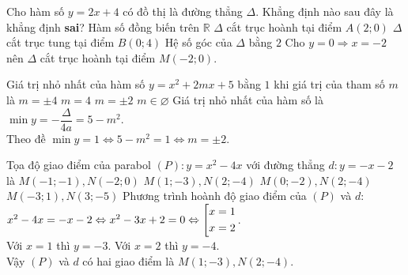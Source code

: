 \begin{ex}%
Cho hàm số $y=2x+4$ có đồ thị là đường thẳng $\Delta$. Khẳng định nào sau đây là khẳng định \textbf{sai}?
\choice
{Hàm số đồng biến trên $\mathbb{R}$}
{\True $\Delta$ cắt trục hoành tại điểm $A\left(2;0\right)$}
{$\Delta$ cắt trục tung tại điểm $B\left(0;4\right)$}
{Hệ số góc của $\Delta$ bằng $2$}
\loigiai
{Cho $y=0\Rightarrow x=-2$ nên $\Delta$ cắt trục hoành tại điểm $M\left(-2;0\right)$.}
\end{ex}

\begin{ex}%
Giá trị nhỏ nhất của hàm số $y=x^2+2mx+5$ bằng $1$ khi giá trị của tham số $m$ là
\choice
{$m=\pm 4$}
{$m=4$}
{\True $m=\pm 2$}
{$m\in\varnothing$}
\loigiai
{Giá trị nhỏ nhất của hàm số là $\min  y=-\dfrac{\Delta}{4a}=5-m^2$.\\Theo đề $\min  y=1\Leftrightarrow 5-m^2=1\Leftrightarrow m=\pm 2$.}
\end{ex}

\begin{ex}%
Tọa độ giao điểm của parabol $(P): y=x^2-4x$ với đường thẳng $d: y=-x-2$ là
\choice
{$M\left(-1;-1\right), N\left(-2;0\right)$}
{\True $M\left(1;-3\right), N\left(2;-4\right)$}
{$M\left(0;-2\right), N\left(2;-4\right)$}
{$M\left(-3;1\right), N\left(3;-5\right)$}
\loigiai
{Phương trình hoành độ giao điểm của $(P)$ và $d$: $x^2-4x=-x-2\Leftrightarrow x^2-3x+2=0\Leftrightarrow\left[\begin{aligned}&x=1\\&x=2\end{aligned}\right.$.\\Với $x=1$ thì $y=-3$. Với $x=2$ thì $y=-4$.\\Vậy $(P)$ và $d$ có hai giao điểm là $M\left(1;-3\right), N\left(2;-4\right)$.}
\end{ex}

